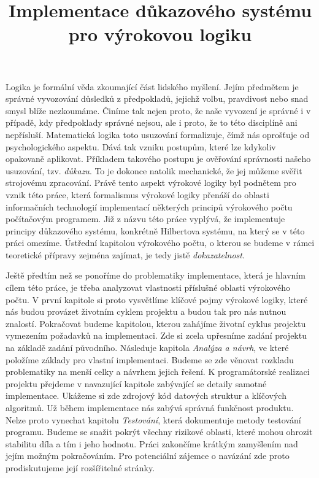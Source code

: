 \documentclass[thesis=B,czech,hidelinks]{FITthesis}[2012/06/26]
\title{Implementace důkazového systému pro výrokovou logiku}
\begin{document}
\theoremstyle{definition}
\newtheorem{ex}{Příklad}
\newtheorem{df}{Definice}
\newtheorem{lm}{Lemma}
\newtheorem{pf}{Důkaz}

%
%
%

\begin{introduction}
Logika je formální věda zkoumající část lidského myšlení. Jejím předmětem je správné vyvozování důsledků z předpokladů, jejichž volbu, pravdivost nebo snad smysl blíže nezkoumáme. Činíme tak nejen proto, že naše vyvození je správné i v případě, kdy předpoklady správné nejsou, ale i proto, že to této disciplíně ani nepřísluší. Matematická logika toto usuzování formalizuje, čímž nás oprošťuje od psychologického aspektu. Dává tak vzniku postupům, které lze kdykoliv opakovaně aplikovat. Příkladem takového postupu je ověřování správnosti našeho usuzování, tzv. \emph{důkazu}. To je dokonce natolik mechanické, že jej můžeme svěřit strojovému zpracování\cite{sochor}. Právě tento aspekt výrokové logiky byl podnětem pro vznik této práce, která formalismus výrokové logiky přenáší do oblasti informačních technologií implementací některých principů výrokového počtu počítačovým programem. Již z názvu této práce vyplývá, že implementuje principy důkazového systému, konkrétně Hilbertova systému, na který se v této práci omezíme. Ústřední kapitolou výrokového počtu, o kterou se budeme v rámci teoretické přípravy zejména zajímat, je tedy jistě \emph{dokazatelnost}.

Ještě předtím než se ponoříme do problematiky implementace, která je hlavním cílem této práce, je třeba analyzovat vlastnosti příslušné oblasti výrokového počtu. V první kapitole si proto vysvětlíme klíčové pojmy výrokové logiky, které nás budou provázet životním cyklem projektu a budou tak pro nás nutnou znalostí. Pokračovat budeme kapitolou, kterou zahájíme životní cyklus projektu vymezením požadavků na implementaci. Zde si zcela upřesníme zadání projektu na základě zadání původního. Následuje kapitola \emph{Analýza a návrh}, ve které položíme základy pro vlastní implementaci. Budeme se zde věnovat rozkladu problematiky na menší celky a návrhem jejich řešení. K programátorské realizaci projektu přejdeme v navazující kapitole zabývající se detaily samotné implementace. Ukážeme si zde zdrojový kód datových struktur a klíčových algoritmů. Už během implementace nás zabývá správná funkčnost produktu. Nelze proto vynechat kapitolu \emph{Testování}, která dokumentuje metody testování programu. Budeme se snažit pokrýt všechny rizikové oblasti, které mohou ohrozit stabilitu díla a tím i jeho hodnotu. Práci zakončíme krátkým zamyšlením nad jejím možným pokračováním. Pro potenciální zájemce o navázání zde proto prodiskutujeme její rozšířitelné stránky.
\end{introduction}
\end{document}
